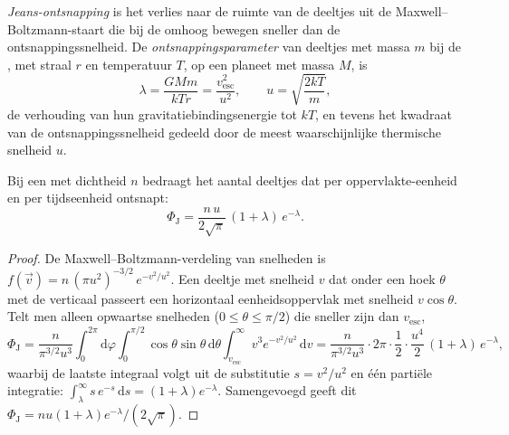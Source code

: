 \begin{definition}\label{def:b3:planetary-atmospheres:jeans-escape}
\emph{Jeans-ontsnapping} is het verlies naar de ruimte van de
deeltjes uit de Maxwell--Boltzmann-staart die bij de  omhoog bewegen
sneller dan de ontsnappingssnelheid. De
\emph{ontsnappingsparameter} van deeltjes met massa $m$ bij de ,
met straal $r$ en temperatuur $T$, op een planeet met massa $M$, is
\[
\lambda = \frac{GMm}{kTr} = \frac{v_\mathrm{esc}^2}{u^2},
\qquad u = \sqrt{\frac{2kT}m},
\]
de verhouding van hun gravitatiebindingsenergie tot $kT$, en tevens het
kwadraat van de ontsnappingssnelheid gedeeld door de meest waarschijnlijke thermische snelheid $u$.
\end{definition}

\begin{theorem}\label{thm:b3:planetary-atmospheres:jeans}
Bij een  met dichtheid $n$ bedraagt het aantal deeltjes dat per
oppervlakte-eenheid en per tijdseenheid ontsnapt:
\[
\Phi_\mathrm J = \frac{n\,u}{2\sqrt\pi}\,(1 + \lambda)\,e^{-\lambda}.
\]
\end{theorem}

\begin{proof}
De Maxwell--Boltzmann-verdeling van snelheden is $f(\vec v) =
n\,(\pi u^2)^{-3/2}\,e^{-v^2/u^2}$. Een deeltje met snelheid $v$ dat
onder een hoek $\theta$ met de verticaal passeert een horizontaal eenheidsoppervlak met
snelheid $v\cos\theta$. Telt men alleen opwaartse snelheden ($0 \le \theta \le
\pi/2$) die sneller zijn dan $v_\mathrm{esc}$,
\[
\Phi_\mathrm J = \frac{n}{\pi^{3/2}u^3}\int_0^{2\pi}\!\!\mathrm d\varphi
\int_0^{\pi/2}\!\!\cos\theta\sin\theta\,\mathrm d\theta
\int_{v_\mathrm{esc}}^\infty v^3e^{-v^2/u^2}\,\mathrm dv
= \frac{n}{\pi^{3/2}u^3}\cdot2\pi\cdot\frac12\cdot
\frac{u^4}2\,(1 + \lambda)\,e^{-\lambda},
\]
waarbij de laatste integraal volgt uit de substitutie $s = v^2/u^2$ en
één partiële integratie: $\int_\lambda^\infty s\,e^{-s}\,\mathrm ds =
(1 + \lambda)e^{-\lambda}$. Samengevoegd geeft dit $\Phi_\mathrm J = n u (1 +
\lambda) e^{-\lambda}/(2\sqrt\pi)$.
\end{proof}

